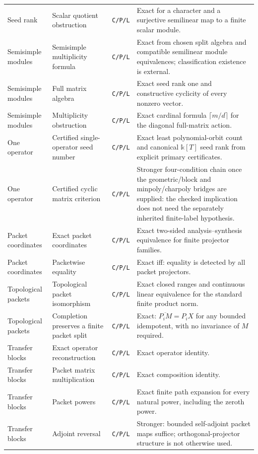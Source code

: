 \documentclass[11pt]{article}
\theoremstyle{definition}
\theoremstyle{remark}
\newcommand{\bbk}{\mathbb{k}}
\newcommand{\closure}[1]{\overline{#1}}
\begin{document}
\begin{longtable}{L{0.16\textwidth}L{0.25\textwidth}L{0.10\textwidth}L{0.38\textwidth}}
Seed rank & Scalar quotient obstruction & \texttt{C/P/L} & Exact for a character and a surjective semilinear map to a finite scalar module. \\
Semisimple modules & Semisimple multiplicity formula & \texttt{C/P/L} & Exact from chosen split algebra and compatible semilinear module equivalences; classification existence is external. \\
Semisimple modules & Full matrix algebra & \texttt{C/P/L} & Exact seed rank one and constructive cyclicity of every nonzero vector. \\
Semisimple modules & Multiplicity obstruction & \texttt{C/P/L} & Exact cardinal formula $\lceil m/d\rceil$ for the diagonal full-matrix action. \\
One operator & Certified single-operator seed number & \texttt{C/P/L} & Exact least polynomial-orbit count and canonical $\bbk[T]$ seed rank from explicit primary certificates. \\
One operator & Certified cyclic matrix criterion & \texttt{C/P/L} & Stronger four-condition chain once the geometric/block and minpoly/charpoly bridges are supplied: the checked implication does not need the separately inherited finite-label hypothesis. \\
Packet coordinates & Exact packet coordinates & \texttt{C/P/L} & Exact two-sided analysis--synthesis equivalence for finite projector families. \\
Packet coordinates & Packetwise equality & \texttt{C/P/L} & Exact iff: equality is detected by all packet projectors. \\
Topological packets & Topological packet isomorphism & \texttt{C/P/L} & Exact closed ranges and continuous linear equivalence for the standard finite product norm. \\
Topological packets & Completion preserves a finite packet split & \texttt{C/P/L} & Exact: $\closure{P_iM}=P_iX$ for any bounded idempotent, with no invariance of $M$ required. \\
Transfer blocks & Exact operator reconstruction & \texttt{C/P/L} & Exact operator identity. \\
Transfer blocks & Packet matrix multiplication & \texttt{C/P/L} & Exact composition identity. \\
Transfer blocks & Packet powers & \texttt{C/P/L} & Exact finite path expansion for every natural power, including the zeroth power. \\
Transfer blocks & Adjoint reversal & \texttt{C/P/L} & Stronger: bounded self-adjoint packet maps suffice; orthogonal-projector structure is not otherwise used. \\

\end{longtable}
\end{document}
